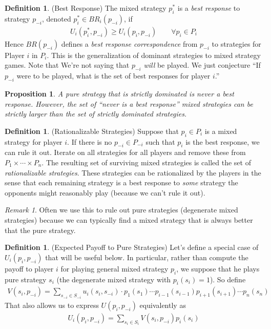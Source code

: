 \documentclass[12pt]{article}
\theoremstyle{plain}
\newtheorem{prop}[thm]{Proposition}
\theoremstyle{definition}
\newtheorem{defn}[thm]{Definition}
\theoremstyle{remark}
\newtheorem*{rmk}{Remark}
\begin{document}
\begin{defn}(Best Response)
The mixed strategy $p^*_i$ is a \emph{best response} to strategy
$p_{-i}$, denoted $p^*_i\in BR_i(p_{-i})$, if
\begin{align*}
  U_i(p^*_i,p_{-i})
  \geq
  U_i(p_i,p_{-i})
  \qquad \forall p_i\in P_i
\end{align*}
Hence $BR(p_{-i})$ defines a \emph{best response correspondence} from
$p_{-i}$ to strategies for Player $i$ in $P_i$.
This is the generalization of dominant strategies to mixed strategy
games. Note that We're not saying that $p_{-i}$ \emph{will} be played.
We just conjecture ``If $p_{-i}$ were to be played, what is the set of
best responses for player $i$.''
\end{defn}

\begin{prop}
A pure strategy that is strictly dominated is never a best response.
However, the set of ``never is a best response'' mixed strategies can be
strictly larger than the set of strictly dominated strategies.
\end{prop}

\begin{defn}(Rationalizable Strategies)
Suppose that $p_i\in P_i$ is a mixed strategy for player $i$. If there
is no $p_{-i}\in P_{-i}$ such that $p_i$ is the best response, we can
rule it out. Iterate on all strategies for all players and remove these
from $P_1\times \cdots \times P_n$. The resulting set of surviving mixed
strategies is called the set of \emph{rationalizable strategies}. These
strategies can be rationalized by the players in the sense that each
remaining strategy is a best response to \emph{some} strategy the
opponents might reasonably play (because we can't rule it out).
\end{defn}
\begin{rmk}
Often we use this to rule out pure strategies (degenerate mixed
strategies) because we can typically find a mixed strategy that is
always better that the pure strategy.
\end{rmk}

\begin{defn}(Expected Payoff to Pure Strategies)
Let's define a special case of $U_i(p_i,p_{-i})$ that will be useful
below. In particular, rather than compute the payoff to player $i$ for
playing general mixed strategy $p_i$, we suppose that he plays pure
strategy $s_i$ (the degenerate mixed strategy with $p_i(s_i)=1$).
So define
\begin{align*}
  V(s_i, p_{-i})
  =
  \sum_{s_{-i}\in S_{-i}}
  u_i(s_i,s_{-i})
  \cdot
  p_1(s_1)
  \cdots
  p_{i-1}(s_{i-1})
  p_{i+1}(s_{i+1})
  \cdots
  p_n(s_n)
\end{align*}
That also allows us to express $U(p_i,p_{-i})$ equivalently as
\begin{align*}
  U_i(p_i,p_{-i})
  =
  \sum_{s_i\in S_i}
  V(s_i,p_{-i}) p_i(s_i)
\end{align*}
\end{defn}
\end{document}
